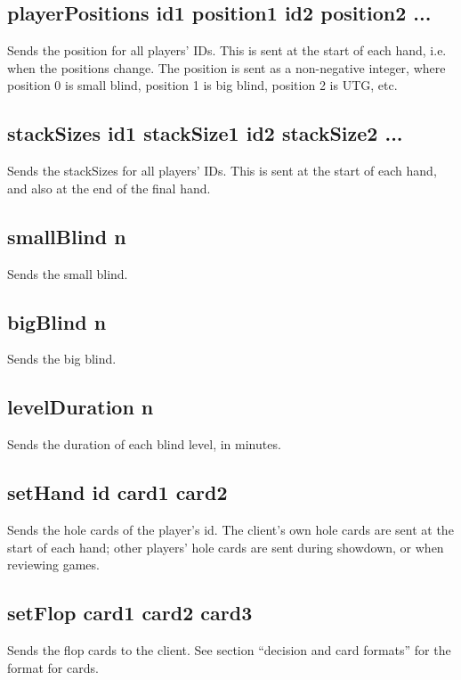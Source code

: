 \documentclass{article}
\begin{document}
\subsection*{playerPositions \textlangle{}id1 position1\textrangle{} \textlangle{}id2 position2\textrangle{} ... }
Sends the position for all players' IDs. This is sent at the start of each hand, i.e. when the positions change. The position is sent as a non-negative integer, where position 0 is small blind, position 1 is big blind, position 2 is UTG, etc.

\subsection*{stackSizes \textlangle{}id1 stackSize1\textrangle{} \textlangle{}id2 stackSize2\textrangle{} ... }
Sends the stackSizes for all players' IDs. This is sent at the start of each hand, and also at the end of the final hand.

\subsection*{smallBlind \textlangle{}n\textrangle{}}
Sends the small blind.

\subsection*{bigBlind \textlangle{}n\textrangle{}}
Sends the big blind.

\subsection*{levelDuration \textlangle{}n\textrangle{}}
Sends the duration of each blind level, in minutes.

\subsection*{setHand \textlangle{}id\textrangle{} \textlangle{}card1\textrangle{} \textlangle{}card2\textrangle{}}
Sends the hole cards of the player's id. The client's own hole cards are sent at the start of each hand; other players' hole cards are sent during showdown, or when reviewing games.

\subsection*{setFlop \textlangle{}card1\textrangle{} \textlangle{}card2\textrangle{}  \textlangle{}card3\textrangle{}}
Sends the flop cards to the client. See section ``decision and card formats'' for the format for cards.
\end{document}
